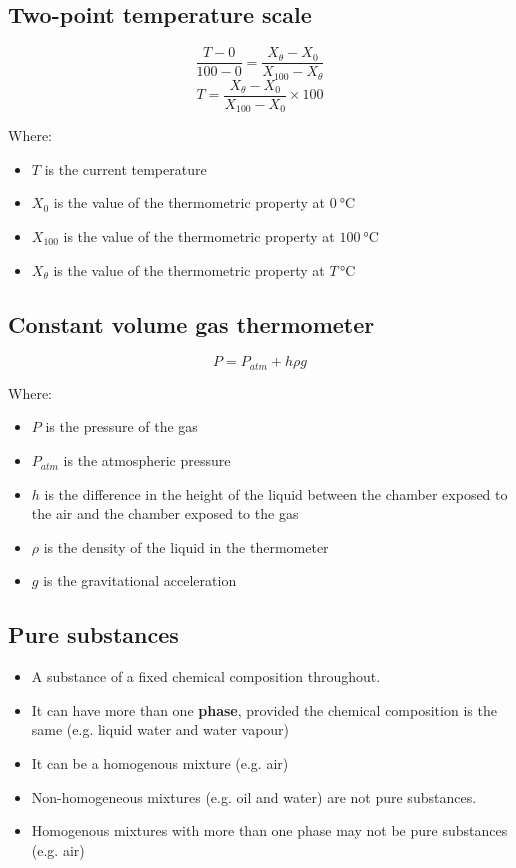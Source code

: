 \documentclass[11pt]{article}
\begin{document}
\subsection{Two-point temperature scale}
\label{sec:org0d8c400}
\[\frac{T - 0}{100 - 0} = \frac{X_\theta - X_0}{X_{100} - X_\theta}\]
\[T = \frac{X_\theta - X_0}{X_{100} - X_0} \times 100\]

Where:
\begin{itemize}
\item \(T\) is the current temperature
\item \(X_0\) is the value of the thermometric property at \(\qty{0}{\degreeCelsius}\)
\item \(X_{100}\) is the value of the thermometric property at \(\qty{100}{\degreeCelsius}\)
\item \(X_\theta\) is the value of the thermometric property at \(T \, \unit{\degreeCelsius}\)
\end{itemize}

\subsection{Constant volume gas thermometer}
\label{sec:org64279b3}
\[P = P_{atm} + h \rho g\]

Where:
\begin{itemize}
\item \(P\) is the pressure of the gas
\item \(P_{atm}\) is the atmospheric pressure
\item \(h\) is the difference in the height of the liquid between the chamber exposed to the air and the chamber exposed to the gas
\item \(\rho\) is the density of the liquid in the thermometer
\item \(g\) is the gravitational acceleration
\end{itemize}

\subsection{Pure substances}
\label{sec:org1f15611}
\begin{itemize}
\item A substance of a fixed chemical composition throughout.
\item It can have more than one \textbf{phase}, provided the chemical composition is the same (e.g. liquid water and water vapour)
\item It can be a homogenous mixture (e.g. air)
\item Non-homogeneous mixtures (e.g. oil and water) are not pure substances.
\item Homogenous mixtures with more than one phase may not be pure substances (e.g. air)
\end{itemize}
\end{document}
